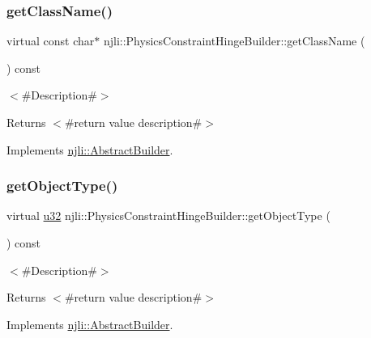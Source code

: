 \subsubsection{\texorpdfstring{get\+Class\+Name()}{getClassName()}}
{\footnotesize\ttfamily virtual const char$\ast$ njli\+::\+Physics\+Constraint\+Hinge\+Builder\+::get\+Class\+Name (\begin{DoxyParamCaption}{ }\end{DoxyParamCaption}) const\hspace{0.3cm}{\ttfamily [virtual]}}

$<$\#\+Description\#$>$

\begin{DoxyReturn}{Returns}
$<$\#return value description\#$>$ 
\end{DoxyReturn}


Implements \mbox{\hyperlink{classnjli_1_1_abstract_builder_a902f73ea78031b06aca183a417f3413b}{njli\+::\+Abstract\+Builder}}.

\mbox{\label{classnjli_1_1_physics_constraint_hinge_builder_a88866caafa7de85fb729148d52c3c020}} 
\subsubsection{\texorpdfstring{get\+Object\+Type()}{getObjectType()}}
{\footnotesize\ttfamily virtual \mbox{\hyperlink{_util_8h_a10e94b422ef0c20dcdec20d31a1f5049}{u32}} njli\+::\+Physics\+Constraint\+Hinge\+Builder\+::get\+Object\+Type (\begin{DoxyParamCaption}{ }\end{DoxyParamCaption}) const\hspace{0.3cm}{\ttfamily [virtual]}}

$<$\#\+Description\#$>$

\begin{DoxyReturn}{Returns}
$<$\#return value description\#$>$ 
\end{DoxyReturn}


Implements \mbox{\hyperlink{classnjli_1_1_abstract_builder_a0f2d344fcf697b167f4f2b1122b5fb33}{njli\+::\+Abstract\+Builder}}.

\mbox{\label{classnjli_1_1_physics_constraint_hinge_builder_af6d72e9484339ace1c657fd0f2d75153}} 
